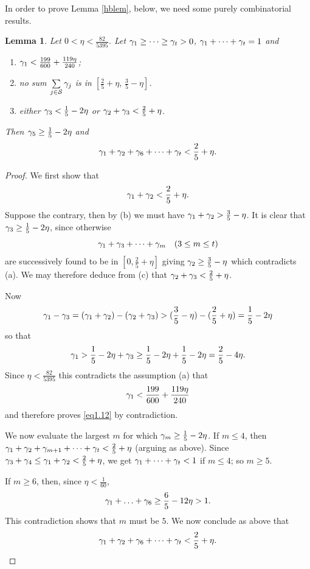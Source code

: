 \documentclass[12pt]{amsart}
\theoremstyle{plain}
\newtheorem{lem}{Lemma}
\theoremstyle{definition}
\newcommand{\mc}{\mathcal}
\numberwithin{equation}{section}
\begin{document}
In order to prove Lemma \ref{hblem}, below, we need some purely combinatorial results.  

 \begin{lem}\label{lem2}
Let $0 < \eta < \frac{82}{5395}$. Let $\gamma_1 \ge \cdots \ge \gamma_t > 0$, $\gamma_1 + \cdots + \gamma_t = 1$ and
 \begin{enumerate}
\item[(a)] $\gamma_1 <\frac{199}{600}+\frac{119\eta}{240}$;


\item[(b)] no sum $\sum\limits_{j\in \mc S} \g_j$ is in $\left[\frac 25 + \eta, \, \frac 35 - \eta\right]$.

\item[(c)] {\rm either} $\gamma_3 < \frac 15 - 2\eta$ {\rm or} $\gamma_2 + \gamma_3 < \frac 25 + \eta$. 
 \end{enumerate}
Then $\gamma_5 \ge \frac 15 - 2\eta$ and
 $$\gamma_1 + \gamma_2 + \gamma_6 + \cdots + \gamma_t <
 \frac 25 + \eta.$$
 \end{lem}
 
 \begin{proof}
We first show that 
 \begin{equation}\label{eq1.12}
\gamma_1 + \gamma_2 < \frac 25 + \eta. 
 \end{equation}
Suppose the contrary, then by (b) we must have $\gamma_1 + \gamma_2 > \frac 35 - \eta$. It is clear that $\gamma_3 \ge \frac 15 - 2\eta$, since otherwise
 \[\gamma_1 + \gamma_3 + \cdots + \gamma_m \quad
 (3 \le m \le t)\]
are successively found to be in $\left[0, \frac 25 + \eta\right]$ giving $\gamma_2 \ge \frac 35 - \eta$ which contradicts (a).  We may therefore deduce from (c) that $\gamma_2 + \gamma_3 < \frac 25 + \eta$.

Now 
$$\gamma_1 - \gamma_3 = (\gamma_1+\gamma_2)-(\gamma_2+\gamma_3)>(\frac35-\eta)-(\frac25+\eta)=\frac15-2\eta$$
so that 
$$\gamma_1> \frac15-2\eta+\gamma_3\geq \frac15-2\eta+\frac15-2\eta=\frac25-4\eta.$$
Since $\eta<\frac{82}{5395}$ this contradicts the assumption (a) that 
$$\gamma_1<\frac{199}{600}+\frac{119\eta}{240}$$
and therefore proves \eqref{eq1.12} by contradiction.

We now evaluate the largest $m$ for which $\gamma_m \ge \frac15 - 2\eta$.  If $m \le 4$, then $\gamma_1 + \gamma_2 + \gamma_{m+1} + \cdots + \gamma_t < \frac25 + \eta$ (arguing as above). Since $\gamma_3 + \gamma_4\leq \gamma_1+\gamma_2 < \frac25 + \eta$, we get $\gamma_1 + \cdots + \gamma_t < 1$ if $m \le 4$; so $m \ge 5$.

If $m \ge 6$, then, since $\eta<\frac{1}{60}$,  
$$\gamma_1+\ldots+\gamma_6\geq \frac65-12\eta>1.$$
This contradiction shows that $m$ must be $5$. We now conclude as above that
 \[\gamma_1 + \gamma_2 + \gamma_6 + \cdots +
 \gamma_t < \frac25 + \eta. \qedhere\]
 \end{proof}
 
\end{document}
